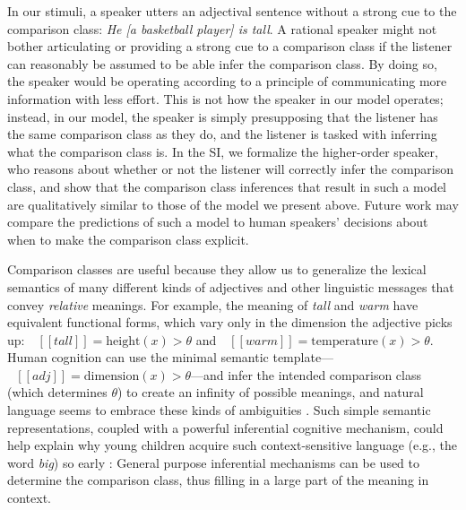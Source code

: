 \documentclass[doc, floatsintext]{apa6}
\newcommand{\denote}[1]{\mbox{ $[\![ #1 ]\!]$}}
\begin{document}
In our stimuli, a speaker utters an adjectival sentence without a strong cue to the comparison class: \emph{He [a basketball player] is tall}.
A rational speaker might not bother articulating or providing a strong cue to a comparison class if the listener can reasonably be assumed to be able infer the comparison class.
By doing so, the speaker would be operating according to a principle of communicating more information with less effort. 
This is not how the speaker in our model operates; instead, in our model, the speaker is simply presupposing that the listener has the same comparison class as they do, and the listener is tasked with inferring what the comparison class is. 
In the SI, we formalize the higher-order speaker, who reasons about whether or not the listener will correctly infer the comparison class, and show that the comparison class inferences that result in such a model are qualitatively similar to those of the model we present above. 
Future work may compare the predictions of such a model to human speakers' decisions about when to make the comparison class explicit.


Comparison classes are useful because they allow us to generalize the lexical semantics of many different kinds of adjectives and other linguistic messages that convey \emph{relative} meanings.
For example, the meaning of \emph{tall} and \emph{warm} have equivalent functional forms, which vary only in the dimension the adjective picks up: $\denote{tall} = \text{height}(x) > \theta$ and $\denote{warm} = \text{temperature}(x) > \theta$.
Human cognition can use the minimal semantic template---$\denote{adj} = \text{dimension}(x) > \theta$---and infer the intended comparison class (which determines $\theta$) to create an infinity of possible meanings, and natural language seems to embrace these kinds of ambiguities \cite{piantadosi2012communicative}.
Such simple semantic representations, coupled with a powerful inferential cognitive mechanism, could help explain why young children acquire such context-sensitive language (e.g., the word \emph{big}) so early \cite{Sera1987,Ebeling1988,Mintz2002,Sandhofer2007}: General purpose inferential mechanisms can be used to determine the comparison class, thus filling in a large part of the meaning in context.


\end{document}
